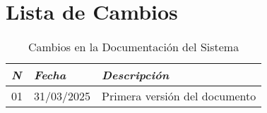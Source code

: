 \section{Lista de Cambios}
\begin{table}[!h]
	\begin{center}
	\begin{tabular}{ | p{0.5cm} | p{4cm} | p{11cm} | }
		\hline
		\rowcolor{lightgray}
		\textbf{\textit{N\textordmasculine}} &
		\hfil \textbf{\textit{Fecha}} &
		\hfil \textbf{\textit{Descripci\'on}} \\ 
		\hline
		01 & 31/03/2025 &
		Primera versi\'on del documento \\  
		\hline
	\end{tabular}
	\end{center}
	\caption{Cambios en la Documentaci\'on del Sistema}
\end{table}
